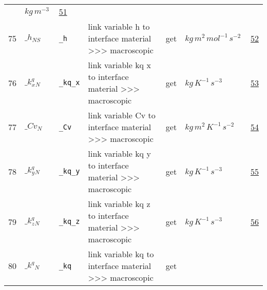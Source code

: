 \begin{longtable}{|p{1cm}|p{2.5cm}|p{4.5cm}|p{8cm}|p{3.0cm}|p{3cm}|p{1cm}|}
             & $ kg \,m^{-3} \, $
             &                 \hyperlink{"e:51"}{ 51 }
                 \\
            75
             & \hypertarget{"v:75"}{ $ {\_h}{_{{N S}}} $}
             & \verb|_h|
             & link variable h to interface material >>> macroscopic
             & \begin{lay}get \end{lay}
             & $ kg \,m^{2} \,mol^{-1} \,s^{-2} \, $
             &                 \hyperlink{"e:52"}{ 52 }
                 \\
            76
             & \hypertarget{"v:76"}{ $ {{\_k^q_x}}{_{N}} $}
             & \verb|_kq_x|
             & link variable kq x to interface material >>> macroscopic
             & \begin{lay}get \end{lay}
             & $ kg \,K^{-1} \,s^{-3} \, $
             &                 \hyperlink{"e:53"}{ 53 }
                 \\
            77
             & \hypertarget{"v:77"}{ $ {{\_Cv}}{_{N}} $}
             & \verb|_Cv|
             & link variable Cv to interface material >>> macroscopic
             & \begin{lay}get \end{lay}
             & $ kg \,m^{2} \,K^{-1} \,s^{-2} \, $
             &                 \hyperlink{"e:54"}{ 54 }
                 \\
            78
             & \hypertarget{"v:78"}{ $ {{\_k^q_y}}{_{N}} $}
             & \verb|_kq_y|
             & link variable kq y to interface material >>> macroscopic
             & \begin{lay}get \end{lay}
             & $ kg \,K^{-1} \,s^{-3} \, $
             &                 \hyperlink{"e:55"}{ 55 }
                 \\
            79
             & \hypertarget{"v:79"}{ $ {{\_k^q_z}}{_{N}} $}
             & \verb|_kq_z|
             & link variable kq z to interface material >>> macroscopic
             & \begin{lay}get \end{lay}
             & $ kg \,K^{-1} \,s^{-3} \, $
             &                 \hyperlink{"e:56"}{ 56 }
                 \\
            80
             & \hypertarget{"v:80"}{ $ {{\_k^q}}{_{N}} $}
             & \verb|_kq|
             & link variable kq to interface material >>> macroscopic
             & \begin{lay}get \end{lay}

\end{longtable}
